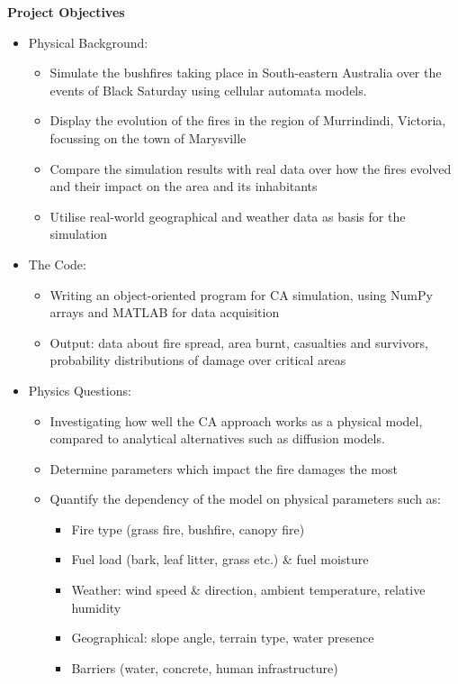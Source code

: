 \textbf{Project Objectives}
\begin{itemize}
    \item Physical Background:\begin{itemize}
        \item Simulate the bushfires taking place in South-eastern Australia over the events of Black Saturday using cellular automata models.
        \item Display the evolution of the fires in the region of Murrindindi, Victoria, focussing on the town of Marysville
        \item Compare the simulation results with real data over how the fires evolved and their impact on the area and its inhabitants 
        \item Utilise real-world geographical and weather data as basis for the simulation
    \end{itemize}
    \item The Code: \begin{itemize}
        \item Writing an object-oriented program for CA simulation, using NumPy arrays and MATLAB for data acquisition
        \item Output: data about fire spread, area burnt, casualties and survivors, probability distributions of damage over critical areas
    \end{itemize}
    \item Physics Questions: \begin{itemize}
        \item Investigating how well the CA approach works as a physical model, compared to analytical alternatives such as diffusion models.
        \item Determine parameters which impact the fire damages the most
        \item Quantify the dependency of the model on physical parameters such as:
        \begin{itemize}
            \item Fire type (grass fire, bushfire, canopy fire)
            \item Fuel load (bark, leaf litter, grass etc.) \& fuel moisture
            \item Weather: wind speed \& direction, ambient temperature, relative humidity
            \item Geographical: slope angle, terrain type, water presence
            \item Barriers (water, concrete, human infrastructure)

\end{itemize}
\end{itemize}
\end{itemize}
